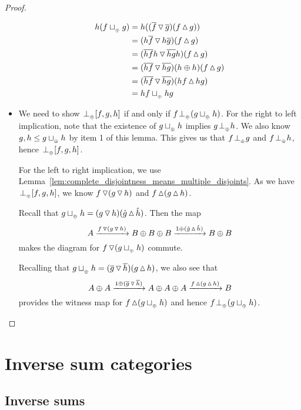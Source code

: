 \begin{proof}
\begin{itemize}
      \begin{align*}
        h (f\tjoin g) &= h ((\rst{f}\tjleft\rst{g})  (f \tjright g))\\
        &= (h\rst{f}\tjleft h\rst{g}) (f \tjright g)\\
        &= (\rst{h f}h\tjleft \rst{h g}h)  (f \tjright g)\\
        &= (\rst{h f}\tjleft \rst{h g})(h\+h)  (f \tjright g)\\
        &= (\rst{h f}\tjleft \rst{h g}) (h f \tjright hg)\\
        &= h f \tjoin h g
      \end{align*}


    \item [\axiom{DJ}{4}] We need to show $\tperp [f,g,h]$ if and only if $f \tperp (g \tjoin h)$.
      For the right to left implication, note that the existence of $g\tjoin h$ implies $g \tperp h$.
      We also know $g, h \le g\tjoin h$ by item 1 of this lemma. This gives us that $f \tperp g$ and
      $f \tperp h$, hence $\tperp [f,g,h]$.

      For the left to right implication, we use
      Lemma~\ref{lem:complete_disjointness_means_multiple_disjoints}. As we have $\tperp [f,g,h]$,
      we  know $f\tjleft(g\tjleft h)$ and $f\tjright(g\tjright h)$.

      Recall that $g\tjoin h = (g\tjleft h)(\rg{g}\tjright\rg{h})$. Then the map
      \[
        A\xrightarrow{f\tjleft(g\tjleft h)} B\+B\+B\xrightarrow{1\+(\rg{g}\tjright\rg{h})} B\+B
      \]
      makes the diagram for $f \tjleft (g\tjoin h)$ commute.

      Recalling that  $g\tjoin h =
      (\rst{g}\tjleft \rst{h})(g\tjright h)$, we also see that
      \[
        A\+A\xrightarrow{1\+(\rst{g}\tjleft\rst{h})}A\+A\+A\xrightarrow{f\tjright(g\tjright h)}B
      \]
      provides the witness map for $f \tjright(g\tjoin h)$ and hence $f \tperp (g \tjoin h)$.
  \end{itemize}

\end{proof}

\section{Inverse sum categories} %
\label{sec:inverse_sum_categories}

\subsection{Inverse sums} %
\label{sub:inverse_sums}

